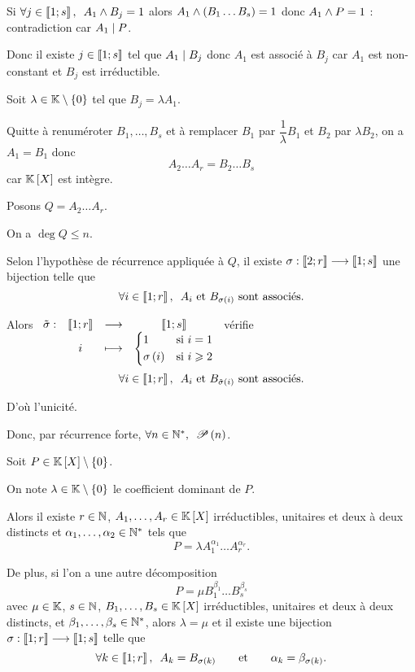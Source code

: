 \begin{dem}
Si \(\quantifs{\forall j\in\interventierii{1}{s}}A_1\et B_j=1\) alors \(A_1\land\left(B_1\dots B_s\right)=1\) donc \(A_1\land P=1\) : contradiction car \(A_1\mid P\).

Donc il existe \( j\in\left\llbracket1;s\right\rrbracket\) tel que \(A_1\mid B_j\)  donc \(A_1\) est associé à \(B_j\) car \(A_1\) est non-constant et \(B_j\) est irréductible.

Soit \(\lambda\in\mathbb{K}\setminus\left\lbrace0\right\rbrace\) tel que \(B_j=\lambda A_1\).

Quitte à renuméroter \(B_1,\dots,B_s\) et à remplacer \(B_1\) par \(\dfrac{1}{\lambda}B_1\) et \(B_2\) par \(\lambda B_2\), on a \(A_1=B_1\) donc \[A_2\dots A_r=B_2\dots B_s\] car \(\poly\) est intègre.

Posons \(Q=A_2\dots A_r\).

On a \(\deg Q\leq n\).

Selon l'hypothèse de récurrence appliquée à \(Q\), il existe \(\sigma:\left\llbracket2;r\right\rrbracket\longrightarrow\left\llbracket1;s\right\rrbracket\) une bijection telle que \[\quantifs{\forall i\in\interventierii{1}{r}}A_i\text{ et }B_{\sigma\paren{i}}\text{ sont associés}.\]

Alors \(\begin{array}[t]{cccc}\tilde{\sigma} : & \left\llbracket1;r\right\rrbracket & \longrightarrow & \left\llbracket1;s\right\rrbracket \\ & i & \longmapsto & \begin{dcases}1 &\text{si }i=1 \\ \sigma\left(i\right) &\text{si }i\geqslant2\end{dcases}\end{array}\) vérifie \[\quantifs{\forall i\in\interventierii{1}{r}}A_i\text{ et }B_{\tilde{\sigma}\paren{i}}\text{ sont associés}.\]

D'où l'unicité.

Donc, par récurrence forte, \(\quantifs{\forall n\in\Ns}\P{n}\).
\end{dem}

\begin{cor}[Reformulation]
Soit \(P\in\poly\excluant\accol{0}\).

On note \(\lambda\in\mathbb{K}\setminus\left\lbrace0\right\rbrace\) le coefficient dominant de \(P\).

Alors il existe \(r\in\mathbb{N}\), \(A_1,\dots,A_r\in\poly\) irréductibles, unitaires et deux à deux distincts et \(\alpha_1,\dots,\alpha_2\in\mathbb{N}^*\) tels que \[P=\lambda A_1^{\alpha_1}\dots A_r^{\alpha_r}.\]

De plus, si l'on a une autre décomposition \[P=\mu B_1^{\beta_1}\dots B_s^{\beta_s}\] avec \(\mu\in\mathbb{K}\), \(s\in\mathbb{N}\), \(B_1,\dots,B_s\in\poly\) irréductibles, unitaires et deux à deux distincts, et \(\beta_1,\dots,\beta_s\in\mathbb{N}^*\), alors \(\lambda=\mu\) et il existe une bijection \(\sigma:\left\llbracket1;r\right\rrbracket\longrightarrow\left\llbracket1;s\right\rrbracket\) telle que \[\quantifs{\forall k\in\interventierii{1}{r}}A_k=B_{\sigma\paren{k}}\qquad\text{et}\qquad\alpha_k=\beta_{\sigma\paren{k}}.\]
\end{cor}

